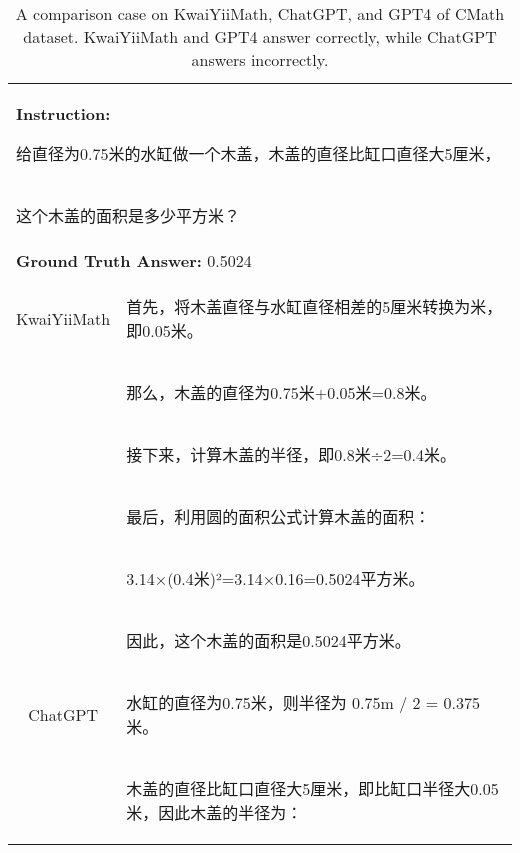 \documentclass{article}
\begin{document}
\begin{table}[h!]
\caption{A comparison case on KwaiYiiMath, ChatGPT, and GPT4 of CMath dataset. KwaiYiiMath and GPT4 answer correctly, while ChatGPT answers incorrectly.}
\begin{tabular}{ c|l } 
 \hline
 \multicolumn{2}{l}{\textbf{Instruction:} \begin{CJK*}{UTF8}{gbsn} 给直径为0.75米的水缸做一个木盖，木盖的直径比缸口直径大5厘米，\end{CJK*}} \\
 \multicolumn{2}{l}{\begin{CJK*}{UTF8}{gbsn}这个木盖的面积是多少平方米？ \end{CJK*}}\\
 \hline
 \multicolumn{2}{l}{\textbf{Ground Truth Answer:} 0.5024} \\
 \hline
 KwaiYiiMath & \begin{CJK*}{UTF8}{gbsn} 首先，将木盖直径与水缸直径相差的5厘米转换为米，即0.05米。\end{CJK*}\\
             & \begin{CJK*}{UTF8}{gbsn} 那么，木盖的直径为0.75米+0.05米=0.8米。\end{CJK*}\\
             & \begin{CJK*}{UTF8}{gbsn} 接下来，计算木盖的半径，即0.8米÷2=0.4米。\end{CJK*}\\
             & \begin{CJK*}{UTF8}{gbsn} 最后，利用圆的面积公式计算木盖的面积：\end{CJK*}\\ 
             & \begin{CJK*}{UTF8}{gbsn} 3.14×(0.4米)²=3.14×0.16=0.5024平方米。\end{CJK*}\\ 
             & \begin{CJK*}{UTF8}{gbsn} 因此，这个木盖的面积是0.5024平方米。\end{CJK*} \\
  \hline
  ChatGPT & \begin{CJK*}{UTF8}{gbsn} 水缸的直径为0.75米，则半径为 0.75m / 2 = 0.375米。\end{CJK*}\\
             & \begin{CJK*}{UTF8}{gbsn} 木盖的直径比缸口直径大5厘米，即比缸口半径大0.05米，因此木盖的半径为：\end{CJK*}\\

\end{tabular}
\end{table}
\end{document}
